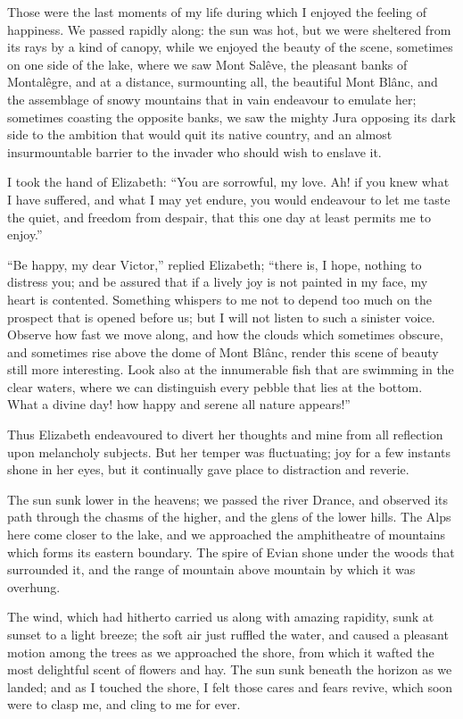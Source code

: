Those were the last moments of my
life during which I enjoyed the feeling
of happiness. We passed rapidly along:
the sun was hot, but we were sheltered
from its rays by a kind of canopy, while
we enjoyed the beauty of the scene,
sometimes on one side of the lake,
where we saw Mont Salêve, the pleasant
banks of Montalêgre, and at a distance,
surmounting all, the beautiful
Mont Blânc, and the assemblage of
snowy mountains that in vain endeavour
to emulate her; sometimes coasting
the opposite banks, we saw the
mighty Jura opposing its dark side to
the ambition that would quit its native
country, and an almost insurmountable
barrier to the invader who should wish
to enslave it.

I took the hand of Elizabeth: ``You
are sorrowful, my love. Ah! if you knew
what I have suffered, and what I may
yet endure, you would endeavour to let
me taste the quiet, and freedom from
despair, that this one day at least permits
me to enjoy.''

``Be happy, my dear Victor,'' replied
Elizabeth; ``there is, I hope,
nothing to distress you; and be assured
that if a lively joy is not painted in my
face, my heart is contented. Something
whispers to me not to depend too much
on the prospect that is opened before
us; but I will not listen to such a sinister
voice. Observe how fast we
move along, and how the clouds which
sometimes obscure, and sometimes rise
above the dome of Mont Blânc, render
this scene of beauty still more interesting.
Look also at the innumerable
fish that are swimming in the clear
waters, where we can distinguish every
pebble that lies at the bottom. What a
divine day! how happy and serene all
nature appears!''

Thus Elizabeth endeavoured to divert
her th\-oughts and mine from all reflection
upon melancholy subjects. But
her temper was fluctuating; joy for a
few instants shone in her eyes, but it
continually gave place to distraction
and reverie.

The sun sunk lower in the heavens;
we passed the river Drance, and observed
its path through the chasms of
the higher, and the glens of the lower
hills. The Alps here come closer to
the lake, and we approached the amphitheatre
of mountains which forms
its eastern boundary. The spire of
Evian shone under the woods that
surrounded it, and the range of
mountain above mountain by which it
was overhung.

The wind, which had hitherto carried
us along with amazing rapidity, sunk at
sunset to a light breeze; the soft air
just ruffled the water, and caused a pleasant
motion among the trees as we approached
the shore, from which it
wafted the most delightful scent of
flowers and hay. The sun sunk beneath
the horizon as we landed; and
as I touched the shore, I felt those
cares and fears revive, which soon
were to clasp me, and cling to me
for ever.

